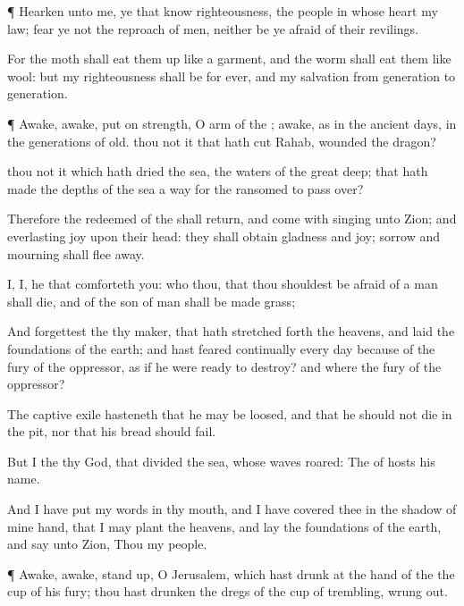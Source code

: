 {\par }{\PP {}¶
Hearken unto me, ye that
know
righteousness, the
people in whose
heart
{} my
law;
fear ye not the
reproach of
men, neither be ye
afraid of their
revilings.

For the
moth shall eat them
up like a
garment, and the
worm shall
eat them like
wool: but my
righteousness shall be for
ever, and my
salvation from
generation to
generation.


\par }{\PP {}¶
Awake,
awake, put
on
strength, O
arm of the
{};
awake, as in the
ancient
days, in the
generations of
old.
{} thou not it that hath
cut
Rahab,
{}
wounded the
dragon?

 thou not it which hath
dried the
sea, the
waters of the
great
deep; that hath
made the
depths of the
sea a
way for the
ransomed to pass
over?

Therefore the
redeemed of the
{} shall
return, and
come with
singing unto
Zion; and
everlasting
joy
{} upon their
head: they shall
obtain
gladness and
joy;
{}
sorrow and
mourning shall flee
away.

I,
{} I,
{} he that
comforteth you: who
{} thou, that thou shouldest be
afraid of a
man
{} shall
die, and of the
son of
man
{} shall be
made
{}
grass;

And
forgettest the
{} thy
maker, that hath stretched
forth the
heavens, and laid the
foundations of the
earth; and hast
feared
continually every
day
because of the
fury of the
oppressor, as
if he were
ready to
destroy? and where
{} the
fury of the
oppressor?

The captive
exile
hasteneth that he may be
loosed, and that he should not
die in the
pit, nor that his
bread should
fail.

But I
{} the
{} thy
God, that
divided the
sea, whose
waves
roared: The
{} of
hosts
{} his
name.

And I have
put my
words in thy
mouth, and I have
covered thee in the
shadow of mine
hand, that I may
plant the
heavens, and lay the
foundations of the
earth, and
say unto
Zion, Thou
{} my
people.


\par }{\PP {}¶
Awake,
awake, stand
up, O
Jerusalem, which hast
drunk at the
hand of the
{} the
cup of his
fury; thou hast
drunken the
dregs of the
cup of
trembling,
{} wrung
{}
out.

}
